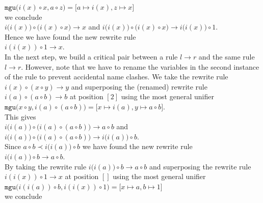 \hspace*{1.3cm}
$\mathtt{mgu}\bigl(i(x) \circ x, a \circ z\bigr) = \bigl[a \mapsto i(x), z \mapsto x\bigr]$ 
\\[0.2cm]
we conclude
\\[0.2cm]
\hspace*{1.3cm}
$i\bigl(i(x)) \circ (i(x) \circ x\bigr) \rightarrow x$ \quad and \quad
$i\bigl(i(x)\bigr) \circ \bigl(i(x) \circ x\bigr) \rightarrow i\bigr(i(x)\bigr) \circ 1$. 
\\[0.2cm]
Hence we have found the new rewrite rule
\\[0.2cm]
\hspace*{1.3cm}
$i(i(x)) \circ 1 \rightarrow x$.
\\[0.2cm]
In the next step, we build a critical pair between a rule $l \rightarrow r$ and the same rule $l \rightarrow r$. 
However, note that we have to rename the variables in the second instance of the rule to prevent accidental name
clashes.  We take the rewrite rule $i(x) \circ (x \circ y) \rightarrow y$ and superposing the (renamed) rewrite rule $i(a) \circ (a \circ b) \rightarrow b$
at position $[2]$ using the most general unifier
\\[0.2cm]
\hspace*{1.3cm}
$\mathtt{mgu}\bigl(x \circ y, i(a) \circ (a \circ b)\bigr) = \bigl[x \mapsto i(a), y \mapsto a \circ b\bigr]$.
\\[0.2cm]
This gives
\\[0.2cm]
\hspace*{1.3cm}
$i\bigl(i(a)\bigr) \circ \bigl(i(a) \circ (a \circ b)\bigr) \rightarrow a \circ b $ \quad and \quad
$i\bigl(i(a)\bigr) \circ \bigl(i(a) \circ (a \circ b)\bigr) \rightarrow i\bigl(i(a)\bigr) \circ b$.
\\[0.2cm]
Since $a \circ b \prec i\bigl(i(a)\bigr) \circ b$ we have found the new rewrite rule
\\[0.2cm]
\hspace*{1.3cm}
$i\bigl(i(a)\bigr) \circ b \rightarrow a \circ b$.
\\[0.2cm]
By taking the rewrite rule $i\bigl(i(a)\bigr) \circ b \rightarrow a \circ b$ and superposing the rewrite rule $i(i(x)) \circ 1 \rightarrow x$ at position $[]$
using the most general unifier
\\[0.2cm]
\hspace*{1.3cm}
$\mathtt{mgu}\bigl(i(i(a)) \circ b, i(i(x)) \circ 1\bigr) = \bigl[x \mapsto a, b \mapsto 1\bigr]$ 
\\[0.2cm]
we conclude
\\[0.2cm]
